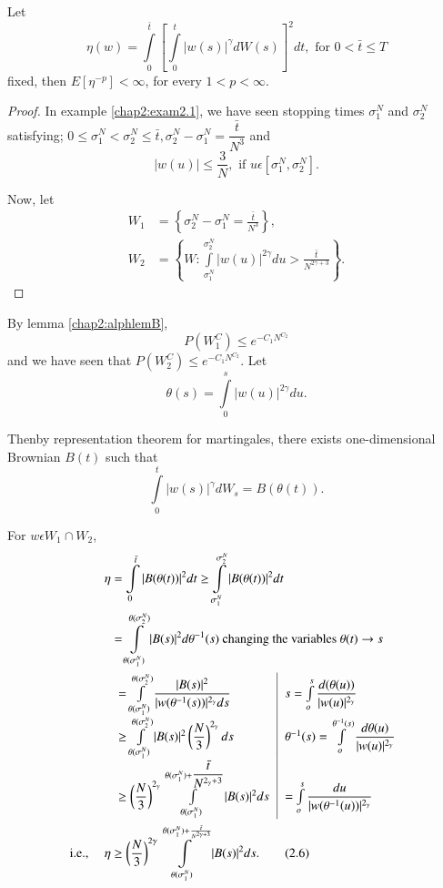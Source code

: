 \begin{example}%
  Let
  $$
  \eta(w)=\int\limits_0^{\bar{t}} \left[\int \limits_0^t|
    w(s)|^{\gamma}dW(s)\right]^2 dt, \text{ for  } 0 <\bar{t} \leq T 
  $$
  fixed, then $E[\eta^{-p}]< \infty$, for every $1 < p < \infty$.
\end{example}

\begin{proof}
  In example \ref{chap2:exam2.1}, we have seen stopping times
  $\sigma_1^N$ and 
  $\sigma_2^N$ satisfying; $0 \leq \sigma_1^N < \sigma_2^N \leq
  \bar{t}, \sigma_2^N-\sigma_1^{N}=\dfrac{\bar{t}}{N^3}$ and 
  $$
  |w(u)| \leq \frac{3}{N}, \text{ if } u \epsilon  \left[\sigma_1^N,
    \sigma_2^N\right]. 
  $$

  Now, let
  \begin{align*}
    W_1 &= \left\{\sigma_2^N-\sigma_1^N = \frac{\bar{t}}{N^3}\right\},\\
    W_2 &= \left\{W: \int \limits_{\sigma_1^N}^{\sigma^N_2}|w(u)|^{2
      \gamma} du > \frac{\bar{t}}{N^{2 \gamma+3}}\right\}. 
  \end{align*}
\end{proof}

By lemma \ref{chap2:alphlemB},
$$
P(W_1^C) \leq e^{-C_1N^{C_2}}
$$
and we have seen that $P(W_2^C) \leq e^{-C_1N^{C_2}}$. Let
$$
\theta(s)= \int\limits_0^s |w(u)|^{2 \gamma} du.
$$

Then\pageoriginale by representation theorem for martingales, there exists
one-dimensional Brownian $B(t)$ such that 
$$
\int\limits_0^t | w(s)|^{\gamma}dW_s=B(\theta(t)).
$$

For $ w \epsilon  W_1 \cap W_2$,
\begin{align*}
  \eta &=\int\limits_0^{\bar{t}}| B(\theta(t))|^2 dt \geq
  \int\limits_{\sigma_1^N}^{\sigma_2^N} | B(\theta(t))|^2 dt\\ 
  &=\int\limits_{\theta(\sigma_1^N)}^{\theta(\sigma_2^N)}| B(s)|^2 d
  \theta^{-1}(s) ~\text{changing the variables}~ \theta(t) \to s\\
  &\begin{tabular}{l|l}
     $= \int\limits_{\theta(\sigma^N_1)}^{\theta (\sigma^N_2)} \dfrac{| B (s)
       |^2}{| w (\theta^{-1} (s)) |^{2_\gamma} ds}$ & $s =
     \int\limits_o^s \dfrac{d (\theta (u))}{| w (u) |^{2_\gamma}}$\\ 
     $\ge \int\limits^{\theta(\sigma_2^N)}_{\theta (\sigma_1^N)} |
     B(s) |^2 \left(\dfrac{N}{3}\right)^{2_\gamma} ds$ & $\theta^{-1} (s) =
     \int\limits_{o}^{\theta^{-1} (s)} \dfrac{d \theta (u)}{|w(u)
       |^{2_\gamma}}$\\ 
     $\ge \left(\dfrac{N}{3}\right)^{2_\gamma} \int\limits^{\theta (\sigma_1^N) +
       \dfrac{\bar{t}}{N^{2_\gamma + 3}}}_{\theta(\sigma_1^N) } |B (s)
     |^2 ds$ & = $\int\limits_o^s \dfrac{du}{| w (\theta^{-1} (u))
       |^{2_\gamma}}$ 
   \end{tabular}\\
  \text{i.e., }\quad \eta & \geq \left(\frac{N}{3}\right)^{2 \gamma}
  \int\limits^{\theta (\sigma_1^N)+ \frac{\bar{t}}{N^{2
  \gamma+3}}}_{\theta (\sigma_1^N)}|B(s)|^2 ds. \tag{2.6}\label{eq2.6} 
\end{align*}

